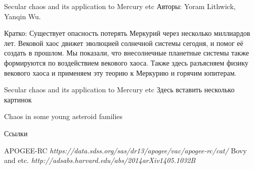 \documentclass{beamer}
\begin{document}
\begin{frame}{Secular chaos and its application to Mercury etc}
        Авторы: Yoram Lithwick, Yanqin Wu.

        Кратко: Существует опасность потерять Меркурий через несколько миллиардов лет. Вековой хаос движет эволюцией солнечной системы сегодня, и помог её создать в прошлом. Мы показали, что внесолнечные планетные системы также формируются по воздействием векового хаоса. Также здесь разъясняем физику векового хаоса и применяем эту теорию к Меркурию и горячим юпитерам.
\end{frame}

\begin{frame}{Secular chaos and its application to Mercury etc}
        Здесь вставить несколько картинок
\end{frame}




\begin{frame}{Chaos in some young asteroid families}

\end{frame}














\begin{frame}{Ссылки}
 \begin{thebibliography}{10}
\beamertemplatebookbibitems
{} {\sc APOGEE-RC} {\em https://data.sdss.org/sas/dr13/apogee/vac/apogee-rc/cat/}
 {\sc Bovy and etc.} {\em http://adsabs.harvard.edu/abs/2014arXiv1405.1032B}
\end{thebibliography}
\end{frame}
\end{document}
